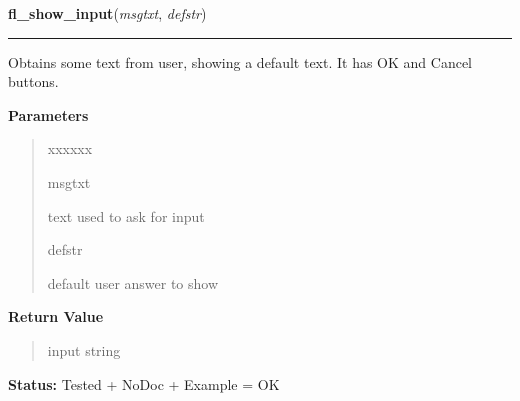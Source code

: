     \label{xformslib:library:fl_show_input}

    \vspace{0.5ex}

\hspace{.8\funcindent}\begin{boxedminipage}{\funcwidth}

    \raggedright \textbf{fl\_show\_input}(\textit{msgtxt}, \textit{defstr})

    \vspace{-1.5ex}

    \rule{\textwidth}{0.5\fboxrule}
\setlength{\parskip}{2ex}
    Obtains some text from user, showing a default text. It has OK and 
    Cancel buttons.

\setlength{\parskip}{1ex}
      \textbf{Parameters}
      \vspace{-1ex}

      \begin{quote}
        \begin{Ventry}{xxxxxx}

          \item[msgtxt]

          text used to ask for input

          \item[defstr]

          default user answer to show

        \end{Ventry}

      \end{quote}

      \textbf{Return Value}
    \vspace{-1ex}

      \begin{quote}
      input string

      \end{quote}

\textbf{Status:} Tested + NoDoc + Example = OK



    \end{boxedminipage}

    \label{xformslib:library:fl_hide_input}

    \vspace{0.5ex}

